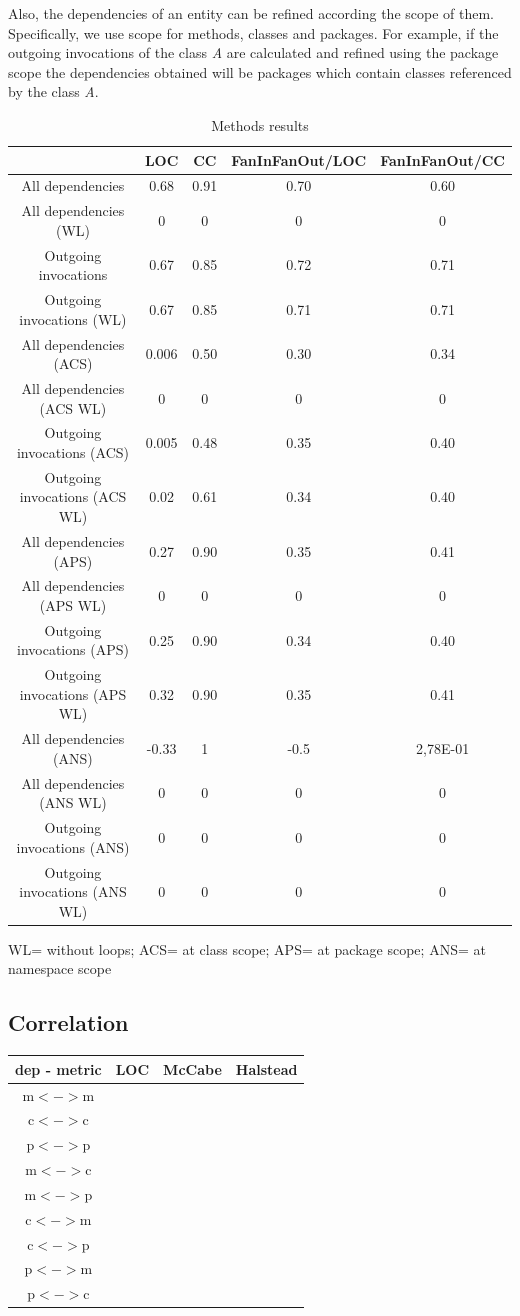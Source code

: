 \documentclass{sig-alternate}
\begin{document}
Also, the dependencies of an entity can be refined according the scope of them. Specifically, we use scope for methods, classes and packages. For example, if the outgoing invocations of the class \emph{A} are calculated and refined using the package scope the dependencies obtained will be packages which contain classes referenced by the class \emph{A}.


\begin{table}
\begin{tabular}{|c|c|c|c|c|}
\hline 
 & LOC & CC & FanInFanOut/LOC & FanInFanOut/CC\tabularnewline
\hline 
\hline 
All dependencies  & 0.68 & 0.91 & 0.70 & 0.60\tabularnewline
\hline 
All dependencies (WL) & 0 & 0 & 0 & 0\tabularnewline
\hline 
Outgoing invocations & 0.67 & 0.85 & 0.72 & 0.71\tabularnewline
\hline 
Outgoing invocations (WL) & 0.67 & 0.85 & 0.71 & 0.71\tabularnewline
\hline 
All dependencies (ACS) & 0.006 & 0.50 & 0.30 & 0.34\tabularnewline
\hline 
All dependencies (ACS WL) & 0 & 0 & 0 & 0\tabularnewline
\hline 
Outgoing invocations (ACS) & 0.005 & 0.48 & 0.35 & 0.40\tabularnewline
\hline 
Outgoing invocations (ACS WL) & 0.02 & 0.61 & 0.34 & 0.40\tabularnewline
\hline 
All dependencies (APS) & 0.27 & 0.90 & 0.35 & 0.41\tabularnewline
\hline 
All dependencies (APS WL) & 0 & 0 & 0 & 0\tabularnewline
\hline 
Outgoing invocations (APS) & 0.25 & 0.90 & 0.34 & 0.40\tabularnewline
\hline 
Outgoing invocations (APS WL) & 0.32 & 0.90 & 0.35 & 0.41\tabularnewline
\hline 
All dependencies (ANS) & -0.33 & 1 & -0.5 & 2,78E-01\tabularnewline
\hline 
All dependencies (ANS WL) & 0 & 0 & 0 & 0\tabularnewline
\hline 
Outgoing invocations (ANS) & 0 & 0 & 0 & 0\tabularnewline
\hline 
Outgoing invocations (ANS WL) & 0 & 0 & 0 & 0\tabularnewline
\hline 
\end{tabular}

\medskip{}
WL= without loops; ACS= at class scope; APS= at package scope; ANS= at namespace scope
\caption{Methods results}



\end{table}

\subsection{Correlation}

\begin{tabular}{|c|c|c|c|}\hline
dep - metric  & LOC & McCabe & Halstead\\\hline
m$<->$m	&	& & \\\hline
c$<->$c	&	& & \\\hline
p$<->$p	&	& & \\\hline
m$<->$c	&	& & \\\hline
m$<->$p	&	& & \\\hline
c$<->$m	&	& & \\\hline
c$<->$p	&	& & \\\hline
p$<->$m	&	& & \\\hline
p$<->$c	&	& & \\\hline
\end{tabular}
\end{document}
